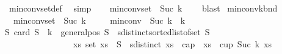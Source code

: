 \begin{isabellebody}
\ {}\ min{\isacharunderscore}{\kern0pt}conv{\isacharunderscore}{\kern0pt}set{\isacharunderscore}{\kern0pt}def\ \isamarkupfalse%
\ simp\isanewline
\ \ \isamarkupfalse%
\ {\isachardoublequoteopen}min{\isacharunderscore}{\kern0pt}conv{\isacharunderscore}{\kern0pt}set\ {}\ {\isacharparenleft}{\kern0pt}Suc\ k{\isacharparenright}{\kern0pt}\ {\isasymnoteq}\ {\isacharbraceleft}{\kern0pt}{\isacharbraceright}{\kern0pt}{\isachardoublequoteclose}\ \isamarkupfalse%
\ blast\isanewline
{}\isamarkupfalse%
%
\endisatagproof
{\isafoldproof}%
%
\isadelimproof
\isanewline
%
\endisadelimproof
\isanewline
{}\isamarkupfalse%
\ min{\isacharunderscore}{\kern0pt}conv{\isacharunderscore}{\kern0pt}{}{\isacharunderscore}{\kern0pt}k{\isacharunderscore}{\kern0pt}bnd{\isacharcolon}{\kern0pt}\isanewline
\ \ \ {\isachardoublequoteopen}min{\isacharunderscore}{\kern0pt}conv{\isacharunderscore}{\kern0pt}set\ {}\ {\isacharparenleft}{\kern0pt}Suc\ k{\isacharparenright}{\kern0pt}\ {\isasymnoteq}\ {\isacharbraceleft}{\kern0pt}{\isacharbraceright}{\kern0pt}{\isachardoublequoteclose}\isanewline
\ \ \ {\isachardoublequoteopen}min{\isacharunderscore}{\kern0pt}conv\ {}\ {\isacharparenleft}{\kern0pt}Suc\ k{\isacharparenright}{\kern0pt}\ {\isachargreater}{\kern0pt}\ k{\isachardoublequoteclose}\isanewline
%
\isadelimproof
%
\endisadelimproof
%
\isatagproof
{}\isamarkupfalse%
{\isacharminus}{\kern0pt}\isanewline
\ \ \isamarkupfalse%
\ {\isachardoublequoteopen}{\isasymexists}S{\isachardot}{\kern0pt}\ {\isacharparenleft}{\kern0pt}card\ S\ {\isacharequal}{\kern0pt}\ k\ {\isasymand}\ general{\isacharunderscore}{\kern0pt}pos\ S\ {\isasymand}\ sdistinct{\isacharparenleft}{\kern0pt}sorted{\isacharunderscore}{\kern0pt}list{\isacharunderscore}{\kern0pt}of{\isacharunderscore}{\kern0pt}set\ S{\isacharparenright}{\kern0pt}{\isacharparenright}{\kern0pt}\isanewline
\ \ \ \ \ \ \ \ \ \ \ \ \ \ \ \ {\isasymand}\ {\isacharparenleft}{\kern0pt}{\isasymforall}xs{\isachardot}{\kern0pt}\ set\ xs\ {\isasymsubseteq}\ S\ {\isasymand}\ sdistinct\ xs\ {\isasymlongrightarrow}\ {\isasymnot}{\isacharparenleft}{\kern0pt}cap\ {}\ xs\ {\isasymor}\ cup\ {\isacharparenleft}{\kern0pt}Suc\ k{\isacharparenright}{\kern0pt}\ xs{\isacharparenright}{\kern0pt}{\isacharparenright}{\kern0pt}{\isachardoublequoteclose}\isanewline
\ \ \isamarkupfalse%
{\isacharminus}{\kern0pt}\isanewline

\end{isabellebody}
